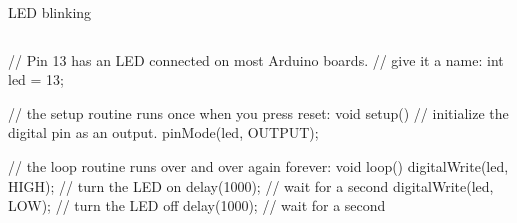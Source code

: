 \documentclass[compress]{beamer}
\begin{document}
\begin{frame}[fragile]{LED blinking}
    \begin{columns}
        \begin{column}{0.7\linewidth}
\begin{cppcode}
// Pin 13 has an LED connected on most Arduino boards.
// give it a name:
int led = 13;

// the setup routine runs once when you press reset:
void setup() {                
  // initialize the digital pin as an output.
  pinMode(led, OUTPUT);     
}

// the loop routine runs over and over again forever:
void loop() {
  digitalWrite(led, HIGH);   // turn the LED on
  delay(1000);               // wait for a second
  digitalWrite(led, LOW);    // turn the LED off
  delay(1000);               // wait for a second
}
\end{cppcode}


\end{column}
\end{columns}
\end{frame}
\end{document}
